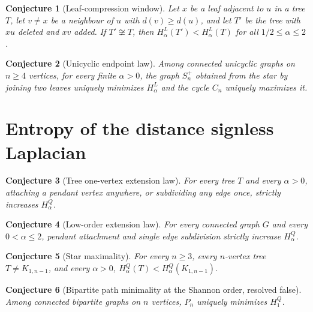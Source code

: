 \documentclass[11pt]{article}
\newtheorem{conjecture}{Conjecture}
\theoremstyle{definition}
\begin{document}
\begin{conjecture}[Leaf-compression window]\label{ab4}
Let $x$ be a leaf adjacent to $u$ in a tree $T$, let $v\ne x$ be a neighbour of $u$ with $d(v)\ge d(u)$, and let $T'$ be the tree with $xu$ deleted and $xv$ added.  If $T'\not\cong T$, then $H^L_\alpha(T')<H^L_\alpha(T)$ for all $1/2\le\alpha\le2$.
\end{conjecture}

\begin{conjecture}[Unicyclic endpoint law]\label{ab5}
Among connected unicyclic graphs on $n\ge4$ vertices, for every finite $\alpha>0$, the graph $S_n^+$ obtained from the star by joining two leaves uniquely minimizes $H^L_\alpha$ and the cycle $C_n$ uniquely maximizes it.
\end{conjecture}

\section{Entropy of the distance signless Laplacian}

\begin{conjecture}[Tree one-vertex extension law]\label{ab6}
For every tree $T$ and every $\alpha>0$, attaching a pendant vertex anywhere, or subdividing any edge once, strictly increases $H^Q_\alpha$.
\end{conjecture}

\begin{conjecture}[Low-order extension law]\label{ab7}
For every connected graph $G$ and every $0<\alpha\le2$, pendant attachment and single edge subdivision strictly increase $H^Q_\alpha$.
\end{conjecture}

\begin{conjecture}[Star maximality]\label{ab8}
For every $n\ge3$, every $n$-vertex tree $T\ne K_{1,n-1}$, and every $\alpha>0$, $H^Q_\alpha(T)<H^Q_\alpha(K_{1,n-1})$.
\end{conjecture}

\begin{conjecture}[Bipartite path minimality at the Shannon order, resolved false]\label{ab9}
Among connected bipartite graphs on $n$ vertices, $P_n$ uniquely minimizes $H^Q_1$.
\end{conjecture}
\end{document}
